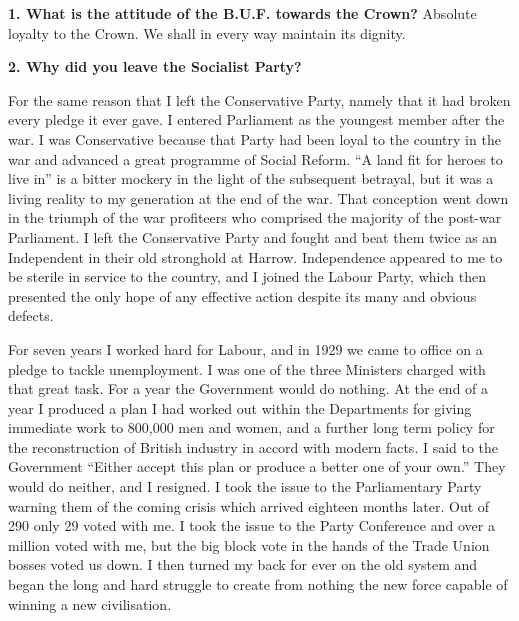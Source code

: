 \documentclass{book}
\begin{document}
\newpage
{}
\pagestyle{plain}
\pagecolor{white}
\color{black}
\begin{flushright}
\textbf{1. What is the attitude of the B.U.F. towards the Crown?}
Absolute loyalty to the Crown. We shall in every way maintain its
dignity.
\end{flushright}
\begin{flushleft}
\textbf{2. Why did you leave the Socialist Party?}

For the same reason that I left the Conservative Party, namely that it had broken every pledge it
ever gave. I entered Parliament as the youngest member after the war. I was Conservative
because that Party had been loyal to the country in the war and advanced a great programme of
Social Reform. ``A land fit for heroes to live in'' is a bitter mockery in the light of the subsequent
betrayal, but it was a living reality to my generation at the end of the war. That conception went
down in the triumph of the war profiteers who comprised the majority of the post-war Parliament.
I left the Conservative Party and fought and beat them twice as an Independent in their old
stronghold at Harrow. Independence appeared to me to be sterile in service to the country, and I
joined the Labour Party, which then presented the only hope of any effective action despite its
many and obvious defects.

For seven years I worked hard for Labour, and in 1929 we came to office on a pledge to tackle
unemployment. I was one of the three Ministers charged with that great task. For a year the
Government would do nothing. At the end of a year I produced a plan I had worked out within
the Departments for giving immediate work to 800,000 men and women, and a further long term
policy for the reconstruction of British industry in accord with modern facts. I said to the
Government ``Either accept this plan or produce a better one of your own.'' They would do
neither, and I resigned. I took the issue to the Parliamentary Party warning them of the coming
crisis which arrived eighteen months later. Out of 290 only 29 voted with me. I took the issue to
the Party Conference and over a million voted with me, but the big block vote in the hands of the
Trade Union bosses voted us down. I then turned my back for ever on the old system and began
the long and hard struggle to create from nothing the new force capable of winning a new
civilisation.


\end{flushleft}
\end{document}
